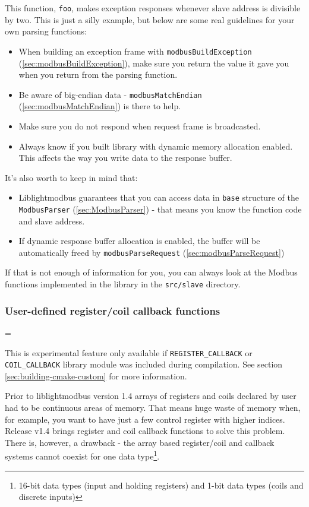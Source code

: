 \documentclass[11pt,a4paper]{article}
\newenvironment{warning}
{
	\par\begin{mdframed}[linewidth=0.5pt,linecolor=black]%
	\begin{list}{}{\leftmargin=1cm
	\labelwidth=\leftmargin}\item[\Large\ding{43}]
}
{	
	\end{list}\end{mdframed}\par
}
\newcommand{\coderef}[1]{\texttt{{#1}} (\ref{sec:#1})}
\newcommand{\warnbox}[1]{\vspace{0.2cm}\begin{warning}{#1}\end{warning}\vspace{0.2cm}}
\begin{document}
This function, \texttt{foo}, makes exception responses whenever slave address is divisible by two. This is just a silly example, but below are some real guidelines for your own parsing functions:
\begin{itemize}
	\setlength\itemsep{0em}
	\item When building an exception frame with \coderef{modbusBuildException}, make sure you return the value it gave you when you return from the parsing function. 
	\item Be aware of big-endian data - \coderef{modbusMatchEndian} is there to help.
	\item Make sure you do not respond when request frame is broadcasted.
	\item Always know if you built library with dynamic memory allocation enabled. This affects the way you write data to the response buffer.
\end{itemize}

It's also worth to keep in mind that:
\begin{itemize}
	\setlength\itemsep{0em}
	\item Liblightmodbus guarantees that you can access data in \texttt{base} structure of the \coderef{ModbusParser} - that means you know the function code and slave address.
	\item If dynamic response buffer allocation is enabled, the buffer will be automatically freed by \coderef{modbusParseRequest}
\end{itemize}

If that is not enough of information for you, you can always look at the Modbus functions implemented in the library in the \texttt{src/slave} directory.



\subsubsection{User-defined register/coil callback functions} \label{sec:slave-register-callback}
\warnbox{This is experimental feature only available if \texttt{REGISTER\_CALLBACK} or \texttt{COIL\_CALLBACK} library module was included during compilation. See section \ref{sec:building-cmake-custom} for more information. }

Prior to liblightmodbus version 1.4 arrays of registers and coils declared by user had to be continuous areas of memory. That means huge waste of memory when, for example, you want to have just a few control register with higher indices. Release v1.4 brings register and coil callback functions to solve this problem. There is, however, a drawback - the array based register/coil and callback systems cannot coexist for one data type\footnote{16-bit data types (input and holding registers) and 1-bit data types (coils and discrete inputs)}.\newline
\end{document}
